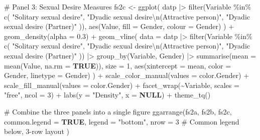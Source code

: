 \documentclass[
  bookmarksnumbered]{article}
\newenvironment{Shaded}{\begin{snugshade}}{\end{snugshade}}
\newcommand{\AttributeTok}[1]{\textcolor[rgb]{0.80,0.80,0.80}{#1}}
\newcommand{\CommentTok}[1]{\textcolor[rgb]{0.50,0.62,0.50}{#1}}
\newcommand{\ConstantTok}[1]{\textcolor[rgb]{0.86,0.64,0.64}{\textbf{#1}}}
\newcommand{\DecValTok}[1]{\textcolor[rgb]{0.86,0.86,0.80}{#1}}
\newcommand{\FloatTok}[1]{\textcolor[rgb]{0.75,0.75,0.82}{#1}}
\newcommand{\FunctionTok}[1]{\textcolor[rgb]{0.94,0.94,0.56}{#1}}
\newcommand{\NormalTok}[1]{\textcolor[rgb]{0.80,0.80,0.80}{#1}}
\newcommand{\OtherTok}[1]{\textcolor[rgb]{0.94,0.94,0.56}{#1}}
\newcommand{\SpecialCharTok}[1]{\textcolor[rgb]{0.86,0.64,0.64}{#1}}
\newcommand{\StringTok}[1]{\textcolor[rgb]{0.80,0.58,0.58}{#1}}
\begin{document}
\begin{Shaded}
\begin{Highlighting}[]
\CommentTok{\# Panel 3: Sexual Desire Measures}
\NormalTok{fs2c }\OtherTok{\textless{}{-}} \FunctionTok{ggplot}\NormalTok{(}
\NormalTok{  datp }\SpecialCharTok{|\textgreater{}} \FunctionTok{filter}\NormalTok{(Variable }\SpecialCharTok{\%in\%} \FunctionTok{c}\NormalTok{(}
    \StringTok{"Solitary sexual desire"}\NormalTok{, }\StringTok{"Dyadic sexual desire}\SpecialCharTok{\textbackslash{}n}\StringTok{(Attractive person)"}\NormalTok{,}
    \StringTok{"Dyadic sexual desire (Partner)"}
\NormalTok{  )),}
  \FunctionTok{aes}\NormalTok{(Value, }\AttributeTok{fill =}\NormalTok{ Gender, }\AttributeTok{colour =}\NormalTok{ Gender)}
\NormalTok{) }\SpecialCharTok{+}
  \FunctionTok{geom\_density}\NormalTok{(}\AttributeTok{alpha =} \FloatTok{0.3}\NormalTok{) }\SpecialCharTok{+}
  \FunctionTok{geom\_vline}\NormalTok{(}
    \AttributeTok{data =}\NormalTok{ datp }\SpecialCharTok{|\textgreater{}}
      \FunctionTok{filter}\NormalTok{(Variable }\SpecialCharTok{\%in\%} \FunctionTok{c}\NormalTok{(}
        \StringTok{"Solitary sexual desire"}\NormalTok{, }\StringTok{"Dyadic sexual desire}\SpecialCharTok{\textbackslash{}n}\StringTok{(Attractive person)"}\NormalTok{,}
        \StringTok{"Dyadic sexual desire (Partner)"}
\NormalTok{      )) }\SpecialCharTok{|\textgreater{}}
      \FunctionTok{group\_by}\NormalTok{(Variable, Gender) }\SpecialCharTok{|\textgreater{}}
      \FunctionTok{summarise}\NormalTok{(}\AttributeTok{mean =} \FunctionTok{mean}\NormalTok{(Value, }\AttributeTok{na.rm =} \ConstantTok{TRUE}\NormalTok{)),}
    \AttributeTok{size =} \DecValTok{1}\NormalTok{, }\FunctionTok{aes}\NormalTok{(}\AttributeTok{xintercept =}\NormalTok{ mean, }\AttributeTok{color =}\NormalTok{ Gender, }\AttributeTok{linetype =}\NormalTok{ Gender)}
\NormalTok{  ) }\SpecialCharTok{+}
  \FunctionTok{scale\_color\_manual}\NormalTok{(}\AttributeTok{values =}\NormalTok{ color.Gender) }\SpecialCharTok{+}
  \FunctionTok{scale\_fill\_manual}\NormalTok{(}\AttributeTok{values =}\NormalTok{ color.Gender) }\SpecialCharTok{+}
  \FunctionTok{facet\_wrap}\NormalTok{(}\SpecialCharTok{\textasciitilde{}}\NormalTok{Variable, }\AttributeTok{scales =} \StringTok{"free"}\NormalTok{, }\AttributeTok{ncol =} \DecValTok{3}\NormalTok{) }\SpecialCharTok{+}
  \FunctionTok{labs}\NormalTok{(}\AttributeTok{y =} \StringTok{"Density"}\NormalTok{, }\AttributeTok{x =} \ConstantTok{NULL}\NormalTok{) }\SpecialCharTok{+}
  \FunctionTok{theme\_tq}\NormalTok{()}

\CommentTok{\# Combine the three panels into a single figure}
\FunctionTok{ggarrange}\NormalTok{(fs2a, fs2b, fs2c,}
  \AttributeTok{common.legend =} \ConstantTok{TRUE}\NormalTok{, }\AttributeTok{legend =} \StringTok{"bottom"}\NormalTok{, }\AttributeTok{nrow =} \DecValTok{3} \CommentTok{\# Common legend below, 3{-}row layout}
\NormalTok{)}
\end{Highlighting}
\end{Shaded}
\end{document}
